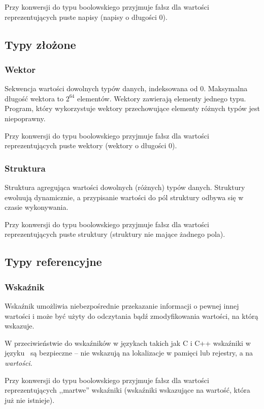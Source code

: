 Przy konwersji do typu boolowskiego przyjmuje fałsz dla wartości
reprezentujących puste napisy (napisy o długości 0).

\subsection{Typy złożone}

\subsubsection{Wektor}

Sekwencja wartości dowolnych typów danych, indeksowana od 0. Maksymalna długość
wektora to $2^{64}$ elementów. Wektory zawierają elementy jednego typu.
Program, który wykorzystuje wektory przechowujące elementy różnych typów jest
niepoprawny.

Przy konwersji do typu boolowskiego przyjmuje fałsz dla wartości
reprezentujących puste wektory (wektory o długości 0).

\subsubsection{Struktura}

Struktura agregująca wartości dowolnych (różnych) typów danych. Struktury
ewoluują dynamicznie, a przypisanie wartości do pól struktury odbywa się w
czasie wykonywania.

Przy konwersji do typu boolowskiego przyjmuje fałsz dla wartości
reprezentujących puste struktury (struktury nie mające żadnego pola).

\subsection{Typy referencyjne}

\subsubsection{Wskaźnik}

Wskaźnik umożliwia niebezpośrednie przekazanie informacji o pewnej innej
wartości i może być użyty do odczytania bądź zmodyfikowania wartości, na którą
wskazuje.

W przeciwieństwie do wskaźników w językach takich jak C i C++ wskaźniki w języku
\ViuAct\ są bezpieczne -- nie wskazują na lokalizacje w pamięci lub rejestry, a
na \emph{wartości}.

Przy konwersji do typu boolowskiego przyjmuje fałsz dla wartości
reprezentujących ,,martwe'' wskaźniki (wskaźniki wskazujące na wartość, która
już nie istnieje).

